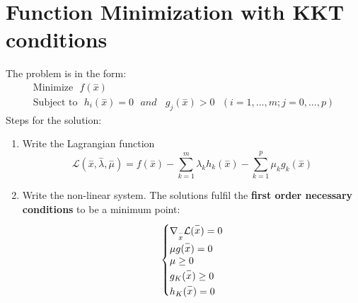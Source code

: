 \documentclass[a4paper,12pt]{article}
\makeatletter
\newenvironment{sistema}%
{\left\lbrace\begin{array}{@{}l@{}}}%
	{\end{array}\right.}
\makeatother
\begin{document}
	\section{Function Minimization with KKT conditions}
	The problem is in the form:
	\begin{gather*}
		\text{Minimize} \ \ \ f( \stackrel{-}{x})
		\label{fun_to_min}\\
		\text{Subject to} \ \ \ h_{i}(\stackrel{-}{x})=0 \ \ \ and \ \ \ \ g_{j}(\stackrel{-}{x})>0 \ \ \ (i=1,...,m; j=0,...,p)
	\end{gather*}
	Steps for the solution:
	\begin{enumerate}
		\item Write the Lagrangian function
		\begin{equation}
			\mathcal{L}(\stackrel{-}{x},\stackrel{-}{\lambda},\stackrel{-}{\mu}) = f( \stackrel{-}{x})- \sum_{k=1}^{m}\lambda_k h_k(\stackrel{-}{x})- \sum_{k=1}^{p}\mu_k g_k(\stackrel{-}{x})
		\end{equation}
		\item Write the non-linear system. The solutions fulfil the \textbf{first order necessary conditions} to be a minimum point: 
		\begin{equation}
			\begin{sistema}
				\nabla_{\stackrel{-}{x}}\mathcal{L}(\stackrel{-}{x})=0\\
				\mu g(\stackrel{-}{x})=0\\
				\mu \ge 0\\
				g_K(\stackrel{-}{x}) \ge 0\\
				h_K(\stackrel{-}{x})=0
			\end{sistema}
		\label{first_necessary}
		\end{equation}
		

\end{enumerate}
\end{document}

